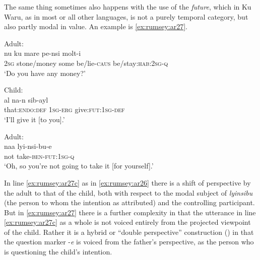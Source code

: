 \documentclass[output=paper]{langsci/langscibook}
\begin{document}
The same thing sometimes also happens with the use of the \textit{future}, which in Ku Waru, as in most or all other languages, is not a purely temporal category, but also partly modal in value. An example is \ref{ex:rumsey:ar27}.

\begin{exe}
	\ex \label{ex:rumsey:ar27}
	\begin{xlist}
	\ex Adult:\label{ex:rumsey:ar27a}\\
	\gll nu ku mare pe-nsi molt-i\\
	2\textsc{sg} stone/money some be/lie-\textsc{caus} be/stay:\textsc{hab}:2\textsc{sg}-\textsc{q}\\
	\trans ‘Do you have any money?’	
	
	\ex Child:\label{ex:rumsey:ar27b}\\
	\gll al na-n sib-ayl\\
	that:\textsc{endo}:\textsc{def}	1\textsc{sg}-\textsc{erg}			give:\textsc{fut}:1\textsc{sg}-\textsc{def}\\
	\trans ‘I’ll give it [to you].’
	
	\ex Adult:\label{ex:rumsey:ar27c}\\
	\gll naa	 lyi-nsi-bu-e\\
	not take-\textsc{ben}-\textsc{fut}:1\textsc{sg}-\textsc{q}\\
	\trans ‘Oh, so you’re not going to take it [for yourself].’
	\end{xlist}
\end{exe}

In line \ref{ex:rumsey:ar27c} as in \ref{ex:rumsey:ar26} there is a shift of perspective by the adult to that of the child, both with respect to the modal subject of \textit{lyinsibu} (the person to whom the intention as attributed) and the controlling participant. But in \ref{ex:rumsey:ar27} there is a further complexity in that the utterance in line \ref{ex:rumsey:ar27c} as a whole is not voiced entirely from the projected viewpoint of the child. Rather it is a hybrid or “double perspective” construction (\citealt{Evans2006a}) in that the question marker -\textit{e} is voiced from the father’s perspective, as the person who is questioning the child’s intention.
\end{document}

